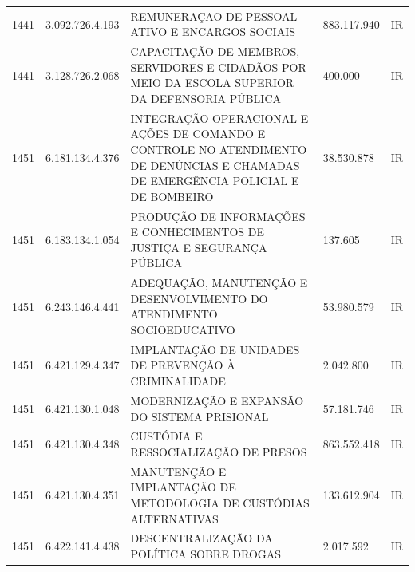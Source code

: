 \documentclass{article}
\begin{document}
\begin{longtable}[c]{m{1cm}|m{2cm}|m{10cm}|m{2cm}|m{1cm}}
\multicolumn{1}{C{1cm}|}{1441} & \multicolumn{1}{C{2cm}|}{3.092.726.4.193} & \multicolumn{1}{L{10cm}|}{REMUNERAÇAO DE PESSOAL ATIVO E ENCARGOS SOCIAIS} & \multicolumn{1}{R{2cm}|}{883.117.940} & \multicolumn{1}{C{1cm}}{IR} \\
\multicolumn{1}{C{1cm}|}{1441} & \multicolumn{1}{C{2cm}|}{3.128.726.2.068} & \multicolumn{1}{L{10cm}|}{CAPACITAÇÃO DE MEMBROS, SERVIDORES E CIDADÃOS  POR MEIO DA ESCOLA SUPERIOR DA DEFENSORIA PÚBLICA} & \multicolumn{1}{R{2cm}|}{400.000} & \multicolumn{1}{C{1cm}}{IR} \\
\multicolumn{1}{C{1cm}|}{1451} & \multicolumn{1}{C{2cm}|}{6.181.134.4.376} & \multicolumn{1}{L{10cm}|}{INTEGRAÇÃO OPERACIONAL E AÇÕES DE COMANDO E CONTROLE NO ATENDIMENTO DE DENÚNCIAS E CHAMADAS DE EMERGÊNCIA POLICIAL E DE BOMBEIRO} & \multicolumn{1}{R{2cm}|}{38.530.878} & \multicolumn{1}{C{1cm}}{IR} \\
\multicolumn{1}{C{1cm}|}{1451} & \multicolumn{1}{C{2cm}|}{6.183.134.1.054} & \multicolumn{1}{L{10cm}|}{PRODUÇÃO DE INFORMAÇÕES E CONHECIMENTOS DE JUSTIÇA E SEGURANÇA PÚBLICA} & \multicolumn{1}{R{2cm}|}{137.605} & \multicolumn{1}{C{1cm}}{IR} \\
\multicolumn{1}{C{1cm}|}{1451} & \multicolumn{1}{C{2cm}|}{6.243.146.4.441} & \multicolumn{1}{L{10cm}|}{ADEQUAÇÃO, MANUTENÇÃO E DESENVOLVIMENTO DO ATENDIMENTO SOCIOEDUCATIVO} & \multicolumn{1}{R{2cm}|}{53.980.579} & \multicolumn{1}{C{1cm}}{IR} \\
\multicolumn{1}{C{1cm}|}{1451} & \multicolumn{1}{C{2cm}|}{6.421.129.4.347} & \multicolumn{1}{L{10cm}|}{IMPLANTAÇÃO DE UNIDADES DE PREVENÇÃO À CRIMINALIDADE} & \multicolumn{1}{R{2cm}|}{2.042.800} & \multicolumn{1}{C{1cm}}{IR} \\
\multicolumn{1}{C{1cm}|}{1451} & \multicolumn{1}{C{2cm}|}{6.421.130.1.048} & \multicolumn{1}{L{10cm}|}{MODERNIZAÇÃO E EXPANSÃO DO SISTEMA PRISIONAL} & \multicolumn{1}{R{2cm}|}{57.181.746} & \multicolumn{1}{C{1cm}}{IR} \\
\multicolumn{1}{C{1cm}|}{1451} & \multicolumn{1}{C{2cm}|}{6.421.130.4.348} & \multicolumn{1}{L{10cm}|}{CUSTÓDIA E RESSOCIALIZAÇÃO DE PRESOS} & \multicolumn{1}{R{2cm}|}{863.552.418} & \multicolumn{1}{C{1cm}}{IR} \\
\multicolumn{1}{C{1cm}|}{1451} & \multicolumn{1}{C{2cm}|}{6.421.130.4.351} & \multicolumn{1}{L{10cm}|}{MANUTENÇÃO E IMPLANTAÇÃO DE METODOLOGIA DE CUSTÓDIAS ALTERNATIVAS} & \multicolumn{1}{R{2cm}|}{133.612.904} & \multicolumn{1}{C{1cm}}{IR} \\
\multicolumn{1}{C{1cm}|}{1451} & \multicolumn{1}{C{2cm}|}{6.422.141.4.438} & \multicolumn{1}{L{10cm}|}{DESCENTRALIZAÇÃO DA POLÍTICA SOBRE DROGAS} & \multicolumn{1}{R{2cm}|}{2.017.592} & \multicolumn{1}{C{1cm}}{IR} \\

\end{longtable}
\end{document}
